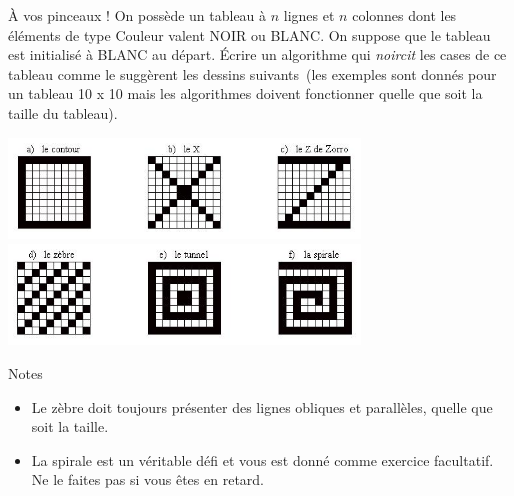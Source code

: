 	\begin{Exercice}{À vos pinceaux !}
		On possède un tableau à $n$ lignes et $n$ colonnes dont les éléments de type
		Couleur valent NOIR ou BLANC. On suppose que le tableau est initialisé
		à BLANC au départ. Écrire un algorithme qui \emph{noircit} les cases de ce
		tableau comme le suggèrent les dessins suivants~(les exemples sont
		donnés pour un tableau 10 x 10 mais les algorithmes doivent fonctionner
		quelle que soit la taille du tableau).
		
		\begin{center}
		\includegraphics[width=0.7\textwidth]{image/tab2d-ex-oxz}
		\includegraphics[width=0.7\textwidth]{image/tab2d-ex-zts}
		\end{center}
		
		Notes
		\begin{itemize}
		\item 
			Le zèbre doit toujours présenter des lignes
			obliques et parallèles, quelle que soit la taille.
		\item
			La spirale est un véritable défi
			et vous est donné comme exercice facultatif.
			Ne le faites pas si vous êtes en retard.
		\end{itemize}
	\end{Exercice}

